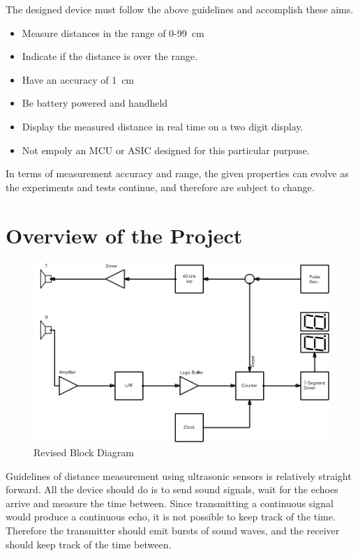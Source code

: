 \documentclass[12pt, a4paper]{article}
\begin{document}
        \noindent The designed device must follow the above guidelines and accomplish these aims. 
        \begin{itemize}
            \item Measure distances in the range of 0-99\SI{}{\centi\metre}
            \item Indicate if the distance is over the range.
            \item Have an accuracy of \SI{1}{\centi\metre}
            \item Be battery powered and handheld
            \item Display the measured distance in real time on a two digit display.
            \item Not empoly an MCU or ASIC designed for this particular purpuse.
        \end{itemize}

        \noindent In terms of measurement accuracy and range, the given properties can evolve as the experiments and tests continue, and therefore are subject to change. 

        
    \pagebreak
    \section{Overview of the Project}

        \begin{figure}[H]\centering
            \includegraphics[width = \textwidth]{schematics/blockdiagram_v3.png}
            \caption[]{Revised Block Diagram}
        \end{figure}

        \bigskip
        Guidelines of distance measurement using ultrasonic sensors is relatively straight forward. All the device should do is to send sound signals, wait for the echoes arrive and measure the time between. Since transmitting a continuous signal would produce a continuous echo, it is not possible to keep track of the time. Therefore the transmitter should emit bursts of sound waves, and the receiver should keep track of the time between.
\end{document}
